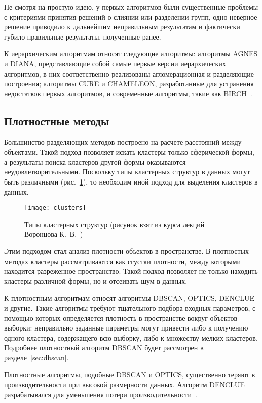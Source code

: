 Не смотря на простую идею, у первых алгоритмов были существенные проблемы с критериями принятия решений о слиянии или разделении групп, одно неверное решение приводило к дальнейшим неправильным результатам и фактически губило правильные результаты, полученные ранее.

К иерархическим алгоритмам относят следующие алгоритмы: алгоритмы AGNES и DIANA, представляющие собой самые первые версии иерархических алгоритмов, в них соответственно реализованы агломерационная и разделяющие построения; алгоритмы CURE и CHAMELEON, разработанные для устранения недостатков первых алгоритмов, и современные алгоритмы, такие как BIRCH~\cite{cod, neiskiy, voron}.

\subsection{Плотностные методы}
Большинство разделяющих методов построено на расчете расстояний между объектами. Такой подход позволяет искать кластеры только сферической формы, а результаты поиска кластеров другой формы оказываются неудовлетворительными. Поскольку типы кластерных структур в данных могут быть различными (рис.~\ref{pic:clusters}), то необходим иной подход для выделения кластеров в данных.
\begin{figure}[h!]
    \centering
    \texttt{[image: clusters]}\\[1ex]
    \parbox{\textwidth}{\caption{Типы кластерных структур (рисунок взят из курса лекций Воронцова К.~В.~\cite{voron})}\label{pic:clusters}}
\end{figure}

Этим подходом стал анализ плотности объектов в пространстве. В плотностых методах кластеры рассматриваются как сгустки плотности, между которыми находится разреженное пространство. Такой подход позволяет не только находить кластеры различной формы, но и отсеивать шум в данных.

К плотностным алгоритмам относят алгоритмы DBSCAN, OPTICS, DENCLUE и другие. Такие алгоритмы требуют тщательного подбора входных параметров, с помощью которых определяется плотность в пространстве вокруг объектов выборки: неправильно заданные параметры могут привести либо к получению одного кластера, содержащего всю выборку, либо к множеству мелких кластеров. Подробнее плотностный алгоритм DBSCAN будет рассмотрен в разделе~\ref{sec:dbscan}.

Плотностные алгоритмы, подобные DBSCAN и OPTICS, существенно теряют в производительности при высокой размерности данных. Алгоритм DENCLUE разрабатывался для уменьшения потери производительности~\cite{cod, neiskiy}.

